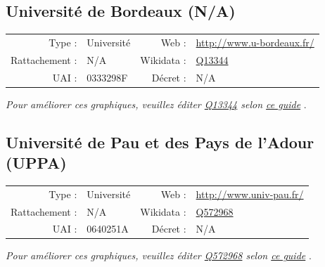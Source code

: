 \documentclass[12pt,french,landscape]{article}
\begin{document}
\newpage

\hypertarget{universituxe9-de-bordeaux-na}{%
\subsection{Université de Bordeaux
(N/A)}\label{universituxe9-de-bordeaux-na}}

\begin{tabular*}{0.45\textwidth}{rp{2cm}rl}  
\hline  
Type : & Université & Web : &\href{http://www.u-bordeaux.fr/}{http://www.u-bordeaux.fr/} \\  
Rattachement : & N/A & Wikidata : & \href{https://www.wikidata.org/entity/Q13344}{Q13344} \\  
UAI : & 0333298F & Décret : & N/A \\  
\hline  
\end{tabular*}

\textit{\scriptsize Pour améliorer ces graphiques, veuillez éditer \href{https://www.wikidata.org/entity/Q13344}{Q13344}  selon \href{https://github.com/cpesr/wikidataESR/blob/master/Rmd/wikidataESR.md}{ce guide}}
.


\newpage

\hypertarget{universituxe9-de-pau-et-des-pays-de-ladour-uppa}{%
\subsection{Université de Pau et des Pays de l'Adour
(UPPA)}\label{universituxe9-de-pau-et-des-pays-de-ladour-uppa}}

\begin{tabular*}{0.45\textwidth}{rp{2cm}rl}  
\hline  
Type : & Université & Web : &\href{http://www.univ-pau.fr/}{http://www.univ-pau.fr/} \\  
Rattachement : & N/A & Wikidata : & \href{https://www.wikidata.org/entity/Q572968}{Q572968} \\  
UAI : & 0640251A & Décret : & N/A \\  
\hline  
\end{tabular*}

\textit{\scriptsize Pour améliorer ces graphiques, veuillez éditer \href{https://www.wikidata.org/entity/Q572968}{Q572968}  selon \href{https://github.com/cpesr/wikidataESR/blob/master/Rmd/wikidataESR.md}{ce guide}}
.

\end{document}
